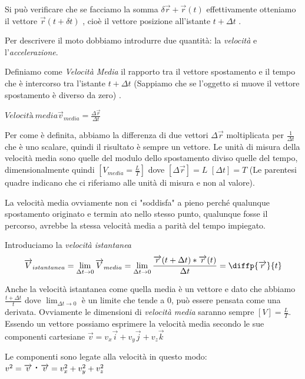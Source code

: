 Si può verificare che se facciamo la somma  $ \delta \overrightarrow{r} + \overrightarrow{r} ( t ) $ effettivamente otteniamo il vettore $ \overrightarrow{r} ( t + \delta t ) $ , cioè il vettore posizione all'istante $ t + \Delta t $ .

Per descrivere il moto dobbiamo introdurre due quantità: la \textit{velocità} e l'\textit{accelerazione}.

Definiamo come \textit{Velocità Media} il rapporto tra il vettore spostamento e il tempo che è intercorso 
tra l'istante $ t + \Delta t$ (Sappiamo che se l'oggetto si muove il vettore spostamento è diverso da zero) . 


$Velocità\   media \overrightarrow{v}_{media} =\frac{\Delta \overrightarrow{r} }{\Delta t} $ 


Per come è definita, abbiamo la differenza di due vettori $\Delta \overrightarrow{r} $
moltiplicata per $\frac{1}{\Delta t}$ che è uno scalare, quindi il risultato è sempre
un vettore. 
Le unità di misura della velocità media sono quelle del modulo dello spostamento
diviso quelle del tempo, dimensionalmente quindi $[V_{media}= \frac{L}{T} ]$ dove $[\Delta\overrightarrow{r}]= L$
$[\Delta t]= T$ (Le parentesi quadre indicano che ci riferiamo alle unità di misura e non al valore).

La velocità media ovviamente non ci "soddisfa" a pieno perché qualunque spostamento
originato e termin  ato nello stesso punto, qualunque fosse il percorso, avrebbe
la stessa velocità media a parità del tempo impiegato.

Introduciamo la \textit{velocità istantanea} 
\begin{equation} 
    \overrightarrow{V}_{istantanea}= 
    \lim_{\Delta t \to 0} \overrightarrow{V}_{media} = 
    \lim_{\Delta t \to 0} \frac { \overrightarrow{r}(t+\Delta t) * \overrightarrow{r}(t) }{\Delta t} = 
    \diffp{\overrightarrow{r}}{t}
\end{equation}

Anche la velocità istantanea come quella media è un vettore e dato che
abbiamo $\frac {t +\Delta t} {t}$ dove $\lim_{\Delta t \to 0}$  è un limite che tende a $0$,
può essere pensata come una derivata.
Ovviamente  le dimensioni di \textit{velocità media}
saranno sempre $[V]=\frac{L}{T}$.
 Essendo un vettore possiamo esprimere la velocità media
 secondo le sue componenti cartesiane 
 $\overrightarrow{v}= v_{x}\overrightarrow{i} + v_{y}\overrightarrow{j} + v_{z}\overrightarrow{k}$

Le componenti sono legate alla velocità in questo modo:
$v^2= \overrightarrow{v} \prodscal\overrightarrow{v}= v_{x}^2+v_{y}^2+v_{z}^2$

